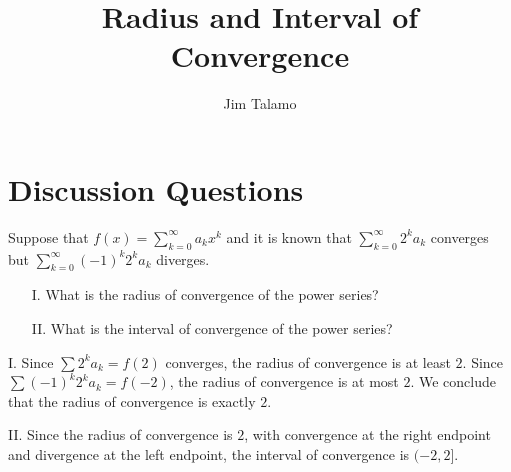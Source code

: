 \documentclass[]{ximera}
\author{Jim Talamo}
\title[handout]{Radius and Interval of Convergence}
\begin{document}
\begin{abstract}
\end{abstract}
\maketitle

\vspace{-0.9in}

\section{Discussion Questions}

\begin{problem} 
Suppose that $f(x) = \sum_{k=0}^{\infty} a_k x^k$ and it is known that $\sum_{k=0}^{\infty} 2^k a_k $ converges but $ \sum_{k=0}^{\infty} (-1)^k 2^k a_k $ diverges.

\begin{itemize}
\item[I.] What is the radius of convergence of the power series?
\item[II.] What is the interval of convergence of the power series?
\end{itemize}

\begin{freeResponse}
I. Since $\sum 2^k a_k = f(2)$ converges, the radius of convergence is at least $2$. Since $\sum (-1)^k 2^k a_k = f(-2)$, the radius of convergence is at most $2$. We conclude that the radius of convergence is exactly $2$.

II. Since the radius of convergence is $2$, with convergence at the right endpoint and divergence at the left endpoint, the interval of convergence is $(-2,2]$. 
\end{freeResponse}
\end{problem}
\end{document}
